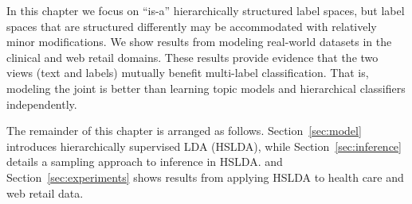 
In this chapter we focus on ``is-a'' hierarchically structured label spaces, but label spaces that are structured differently may be accommodated with relatively minor modifications. 
%
%
We show results from modeling real-world datasets in the clinical and web
retail domains. These results provide evidence that the two views (text and labels) mutually benefit  multi-label
classification. %
That is, modeling the joint  is better than learning 
topic models and hierarchical classifiers
independently. 

The remainder of this chapter is arranged as follows. Section~\ref{sec:model}
introduces hierarchically supervised LDA (HSLDA), while
Section~\ref{sec:inference} details a sampling approach to inference in HSLDA. 
and
Section~\ref{sec:experiments} shows results from applying HSLDA to health care
and web retail data.  


